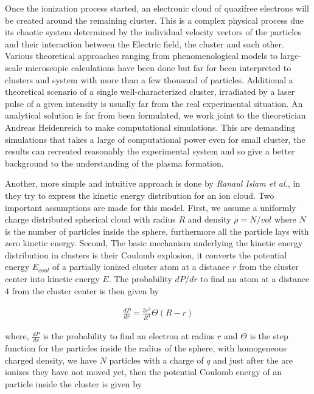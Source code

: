 {Once the ionization process started, an electronic cloud of quazifree electrons will be created around the remaining cluster. This is a complex physical process due its chaotic system determined by the individual velocity vectors of the particles and their interaction between the Electric field, the cluster and each other. Various theoretical approaches ranging from phenomenological models \cite{ditmire_interaction_1996} to large-scale microscopic calculations \cite{saalmann_mechanisms_2006} have been done but far for been interpreted to clusters and system with more than a few thousand of particles. Additional a  theoretical scenario of a single well-characterized cluster, irradiated by a laser pulse of a given intensity is usually far from the real experimental situation. An analytical solution is far from been formulated, we work joint to the theoretician Andreas Heidenreich to make computational simulations. This are demanding simulations that takes a large of computational power even for small cluster, the results can recreated reasonably the experimental system and so give a better background to the understanding of the plasma formation.

Another, more simple and intuitive approach is done by  \textit{Ranaul Islam et al.}, in \cite{islam_kinetic_2006} they try to express the kinetic energy distribution for an ion cloud. Two important assumptions are made for this model. First, we assume a uniformly charge distributed spherical cloud with radius $R$ and density $\rho=N/vol$ where $N$ is the number of particles inside the sphere, furthermore all the particle lays with zero kinetic energy. Second, The basic mechanism underlying the kinetic energy distribution in clusters is their Coulomb explosion, it converts the potential energy $E_{coul}$ of a partially ionized cluster atom at a distance $r$ from the cluster center into kinetic energy $E$. The probability $dP/dr$ to find an atom at a distance $4$ from the cluster center is then given by\cite{islam_kinetic_2006}

\begin{align}
\frac{dP}{dr}=\frac{3 r^2}{R^3} \Theta (R-r)
\label{density_distribution}
\end{align}

where, $\frac{dP}{dr}$ is the probability to find an electron at radius $r$ and $\Theta$ is the step function for the particles inside the radius of the sphere, with homogeneous charged density, we have $N$ particles with a charge of $q$ and just after the are ionizes they have not moved yet, then the potential Coulomb energy of an particle inside the cluster is given by

}
